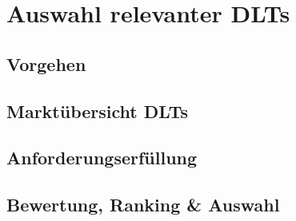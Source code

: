 \chapter{Auswahl relevanter DLTs}
\label{ch:dlt_selection}
\lipsum[1-1]

%
%
\section{Vorgehen}
\label{sec:dlt_selection:approach}
\lipsum[1-1]

%
%
\section{Marktübersicht DLTs}
\label{sec:dlt_selection:market}
\lipsum[1-1]

%
%
\section{Anforderungserfüllung}
\label{sec:dlt_selection:fullfilment}
\lipsum[1-1]

%
%
\section{Bewertung, Ranking \& Auswahl}
\label{sec:dlt_selection:rating}
\lipsum[1-1]
